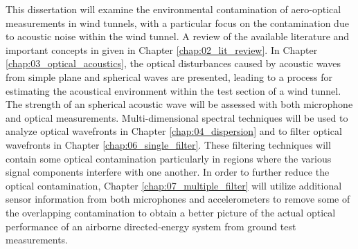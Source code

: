 This dissertation will examine the environmental contamination of aero-optical measurements in wind tunnels, with a particular focus on the contamination due to acoustic noise within the wind tunnel.
A review of the available literature and important concepts in given in Chapter \ref{chap:02_lit_review}.
In Chapter \ref{chap:03_optical_acoustics}, the optical disturbances caused by acoustic waves from simple plane and spherical waves are presented, leading to a process for estimating the acoustical environment within the test section of a wind tunnel.
The strength of an spherical acoustic wave will be assessed with both microphone and optical measurements.
Multi-dimensional spectral techniques will be used to analyze optical wavefronts in Chapter \ref{chap:04_dispersion} and to filter optical wavefronts in Chapter \ref{chap:06_single_filter}.
These filtering techniques will contain some optical contamination particularly in regions where the various signal components interfere with one another.
In order to further reduce the optical contamination, Chapter \ref{chap:07_multiple_filter} will utilize additional sensor information from both microphones and accelerometers to remove some of the overlapping contamination to obtain a better picture of the actual optical performance of an airborne directed-energy system from ground test measurements.
